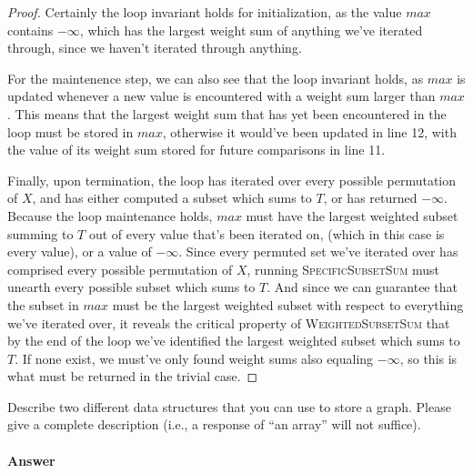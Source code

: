 \documentclass{article}
\begin{document}
\begin{enumerate}
\begin{proof}
			Certainly the loop invariant holds for initialization, as the value $max$ contains $-\infty$, which has
			the largest weight sum of anything we've iterated through, since we haven't iterated through anything.

			For the maintenence step, we can also see that the loop invariant holds, as $max$ is updated whenever
			a new value is encountered with a weight sum larger than $max$. This means that the largest weight sum
			that has yet been encountered in the loop must be stored in $max$, otherwise it would've been updated in
			line 12, with the value of its weight sum stored for future comparisons in line 11.

			Finally, upon termination, the loop has iterated over every possible permutation of $X$, and has either
			computed a subset which sums to $T$, or has returned $-\infty$. Because the loop maintenance holds, $max$
			must have the largest weighted subset summing to $T$ out of every value 
			that's been iterated on, (which in this case is every value), or a value 
			of $-\infty$. Since every permuted set we've iterated over has comprised every possible permutation of $X$,
			running \textsc{SpecificSubsetSum} must unearth every possible subset which sums to $T$. And since we can guarantee
			that the subset in $max$ must be the largest weighted subset with respect to everything we've iterated over,
			it reveals the critical property of \textsc{WeightedSubsetSum} that by the end of the loop we've identified the
			largest weighted subset which sums to $T$. If none exist, we must've only found weight sums also equaling $-\infty$,
			so this is what must be returned in the trivial case.
		\end{proof}






\end{enumerate}




\nextprob
{}

Describe two different data structures that you can use to store a graph.
Please give a complete description (i.e., a response of ``an array'' will not
suffice).

\paragraph{Answer}
\end{document}
